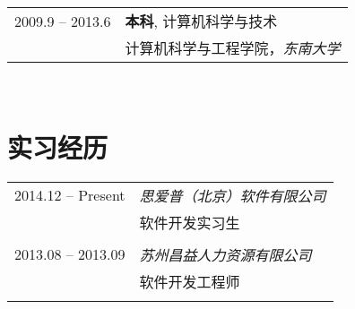\documentclass[10pt]{article} %
\begin{document}
{\begin{minipage}[t]{0.44\textwidth}
\begin{tabular}{rl}

2009.9 -- 2013.6 & \textbf{本科}, 计算机科学与技术 \\ 
& \textsc{计算机科学与工程学院}，\textit{东南大学}\\
	 

	 

	

\end{tabular}\\[10pt]

\section{实习经历} 

\begin{tabular}{rl} %


2014.12 -- Present & \textit{思爱普（北京）软件有限公司} \\ 
& 软件开发实习生\\
& \\

2013.08 -- 2013.09 & \textit{苏州昌益人力资源有限公司} \\ 
& 软件开发工程师\\
& \\



\end{tabular}
\end{minipage}}
\end{document}
